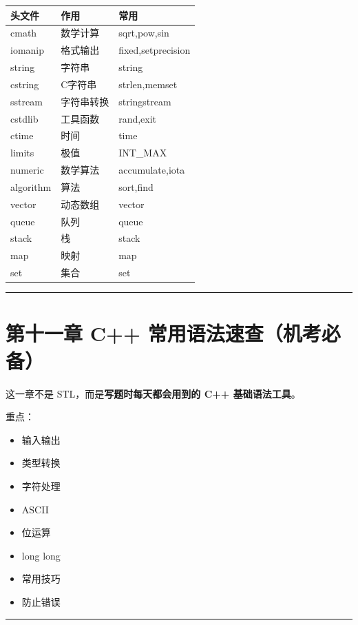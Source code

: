 \documentclass[10pt,twocolumn]{extarticle}
\begin{document}
\begin{table}[h]
\centering
\begin{tabular}{|l|l|l|}
\hline
头文件 & 作用 & 常用 \\ \hline
cmath & 数学计算 & sqrt,pow,sin \\ \hline
iomanip & 格式输出 & fixed,setprecision \\ \hline
string & 字符串 & string \\ \hline
cstring & C字符串 & strlen,memset \\ \hline
sstream & 字符串转换 & stringstream \\ \hline
cstdlib & 工具函数 & rand,exit \\ \hline
ctime & 时间 & time \\ \hline
limits & 极值 & INT\_MAX \\ \hline
numeric & 数学算法 & accumulate,iota \\ \hline
algorithm & 算法 & sort,find \\ \hline
vector & 动态数组 & vector \\ \hline
queue & 队列 & queue \\ \hline
stack & 栈 & stack \\ \hline
map & 映射 & map \\ \hline
set & 集合 & set \\ \hline
\end{tabular}
\end{table}

\noindent\rule{\linewidth}{0.4pt}

\section{第十一章 C++ 常用语法速查（机考必备）}

这一章不是 STL，而是\textbf{写题时每天都会用到的 C++ 基础语法工具}。

重点：
\begin{itemize}
    \item 输入输出
    \item 类型转换
    \item 字符处理
    \item ASCII
    \item 位运算
    \item long long
    \item 常用技巧
    \item 防止错误
\end{itemize}

\noindent\rule{\linewidth}{0.4pt}
\end{document}
